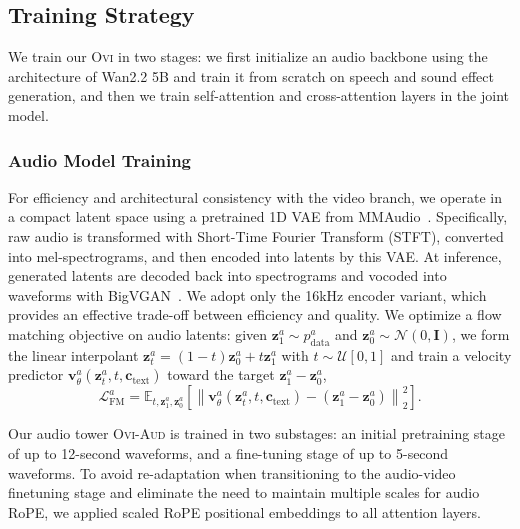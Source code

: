 \documentclass{article} %
\begin{document}
\subsection{Training Strategy}
\label{subsec:training-strat}

We train our \textsc{Ovi} in two stages: we first initialize an audio backbone using the architecture of Wan2.2 5B and train it from scratch on speech and sound effect generation, and then we train self-attention and cross-attention layers in the joint model.

\subsubsection{Audio Model Training}
\label{subsec:audio-training-strat}
For efficiency and architectural consistency with the video branch, we operate in a compact latent space using a pretrained 1D VAE from MMAudio~\cite{cheng2025mmaudio}. Specifically, raw audio is transformed with Short-Time Fourier Transform (STFT), converted into mel-spectrograms, and then encoded into latents by this VAE. At inference, generated latents are decoded back into spectrograms and vocoded into waveforms with BigVGAN~\cite{lee2022bigvgan}. We adopt only the 16kHz encoder variant, which provides an effective trade-off between efficiency and quality. We optimize a flow matching objective on audio latents: given $\mathbf{z}_1^a \sim p_{\text{data}}^a$ and $\mathbf{z}_0^a \sim \mathcal{N}(0,\mathbf{I})$, we form the linear interpolant $\mathbf{z}^a_t=(1-t)\mathbf{z}^a_0+t\mathbf{z}^a_1$ with $t\sim\mathcal{U}[0,1]$ and train a velocity predictor $\mathbf{v}_\theta^a(\mathbf{z}^a_t,t,\mathbf{c}_{\text{text}})$ toward the target $\mathbf{z}^a_1-\mathbf{z}^a_0$,
\begin{equation}
\label{eq:fm_audio}
\mathcal{L}_{\mathrm{FM}}^a=\mathbb{E}_{t,\mathbf{z}^a_1,\mathbf{z}^a_0}\!\left[\left\|\mathbf{v}_\theta^a(\mathbf{z}^a_t,t,\mathbf{c}_{\text{text}})-(\mathbf{z}^a_1-\mathbf{z}^a_0)\right\|_2^2\right].
\end{equation}



Our audio tower \textsc{Ovi-Aud} is trained in two substages:  an initial pretraining stage of up to 12-second waveforms, and a fine-tuning stage of up to 5-second waveforms. To avoid re-adaptation when transitioning to the audio-video finetuning stage and eliminate the need to maintain multiple scales for audio RoPE, we applied scaled RoPE positional embeddings to all attention layers.
\end{document}
